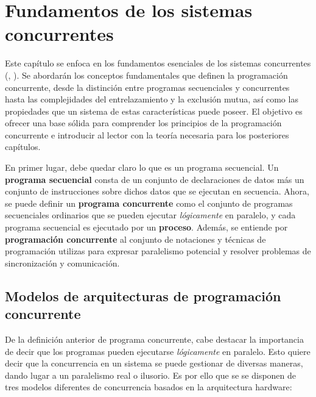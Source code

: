 \chapter{\textbf{Fundamentos de los sistemas concurrentes}}
Este capítulo se enfoca en los fundamentos esenciales de los sistemas concurrentes (\cite{burns1998concurrency}, \cite{capel2020sistemas} ). Se abordarán los conceptos fundamentales que definen la programación concurrente, desde la distinción entre programas secuenciales y concurrentes hasta las complejidades del entrelazamiento y la exclusión mutua, así como las propiedades que un sistema de estas características puede poseer. El objetivo es ofrecer una base sólida para comprender los principios de la programación concurrente e introducir al lector con la teoría necesaria para los posteriores capítulos.

En primer lugar, debe quedar claro lo que es un programa secuencial. Un \textbf{programa secuencial} consta de un conjunto de declaraciones de datos más un conjunto de instrucciones sobre dichos datos que se ejecutan en secuencia. Ahora, se puede definir un \textbf{programa concurrente} como el conjunto de programas secuenciales ordinarios que se pueden ejecutar \textit{lógicamente} en paralelo, y cada programa secuencial es ejecutado por un \textbf{proceso}. Además, se entiende por \textbf{programación concurrente} al conjunto de notaciones y técnicas de programación utilizas para expresar paralelismo potencial y resolver problemas de sincronización y comunicación.

\section{Modelos de arquitecturas de programación concurrente}\label{subsec:concurrentarch}
De la definición anterior de programa concurrente, cabe destacar la importancia de decir que los programas pueden ejecutarse \textit{lógicamente} en paralelo. Esto quiere decir que la concurrencia en un sistema se puede gestionar de diversas maneras, dando lugar a un paralelismo real o ilusorio. Es por ello que se se disponen de tres modelos diferentes de concurrencia basados en la arquitectura hardware:

